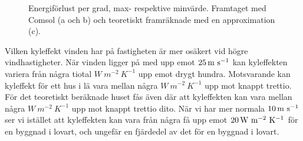\begin{figure}[hpbt]
\centering
{}
\vspace{5mm}


\caption{\label{fig:windenergyloss}Energiförlust per grad, max- respektive minvärde.
Framtaget med Comsol (a och b) och teoretiskt framräknade med en approximation (c).}
\end{figure}

Vilken kyleffekt vinden har på fastigheten är mer osäkert vid högre vindhastigheter. När vinden
 ligger på med upp emot $\unit[25]{m~s^{-1}}$ kan kyleffekten variera från några tiotal $\unit{W~m^{-2}~K^{-1}}$ upp 
 emot drygt hundra. Motsvarande kan kyleffekt för ett hus i lä vara mellan några $\unit{W~m^{-2}~K^{-1}}$ upp mot knappt trettio. För det teoretiskt beräknade huset fås även där att kyleffekten 
 kan vara mellan några $\unit{W~m^{-2}~K^{-1}}$ upp mot knappt trettio dito. När vi har mer normala $\unit[10]{m~s^{-1}}$ ser vi istället att kyleffekten kan vara från några få upp emot $\unit[20]{W~m^{-2}~K^{-1}}$ för en byggnad i 
 lovart, och ungefär en fjärdedel av det för en byggnad i lovart.
 

